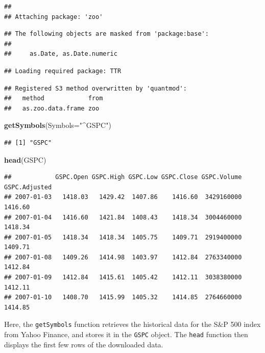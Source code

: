 \documentclass[
]{book}
\newenvironment{Shaded}{\begin{snugshade}}{\end{snugshade}}
\newcommand{\AttributeTok}[1]{\textcolor[rgb]{0.13,0.29,0.53}{#1}}
\newcommand{\FunctionTok}[1]{\textcolor[rgb]{0.13,0.29,0.53}{\textbf{#1}}}
\newcommand{\NormalTok}[1]{#1}
\newcommand{\StringTok}[1]{\textcolor[rgb]{0.31,0.60,0.02}{#1}}
\begin{document}
\begin{verbatim}
## 
## Attaching package: 'zoo'
\end{verbatim}

\begin{verbatim}
## The following objects are masked from 'package:base':
## 
##     as.Date, as.Date.numeric
\end{verbatim}

\begin{verbatim}
## Loading required package: TTR
\end{verbatim}

\begin{verbatim}
## Registered S3 method overwritten by 'quantmod':
##   method            from
##   as.zoo.data.frame zoo
\end{verbatim}

\begin{Shaded}
\begin{Highlighting}[]
\FunctionTok{getSymbols}\NormalTok{(}\AttributeTok{Symbols=}\StringTok{"\^{}GSPC"}\NormalTok{)}
\end{Highlighting}
\end{Shaded}

\begin{verbatim}
## [1] "GSPC"
\end{verbatim}

\begin{Shaded}
\begin{Highlighting}[]
\FunctionTok{head}\NormalTok{(GSPC)}
\end{Highlighting}
\end{Shaded}

\begin{verbatim}
##            GSPC.Open GSPC.High GSPC.Low GSPC.Close GSPC.Volume GSPC.Adjusted
## 2007-01-03   1418.03   1429.42  1407.86    1416.60  3429160000       1416.60
## 2007-01-04   1416.60   1421.84  1408.43    1418.34  3004460000       1418.34
## 2007-01-05   1418.34   1418.34  1405.75    1409.71  2919400000       1409.71
## 2007-01-08   1409.26   1414.98  1403.97    1412.84  2763340000       1412.84
## 2007-01-09   1412.84   1415.61  1405.42    1412.11  3038380000       1412.11
## 2007-01-10   1408.70   1415.99  1405.32    1414.85  2764660000       1414.85
\end{verbatim}

Here, the \texttt{getSymbols} function retrieves the historical data for the S\&P 500 index from Yahoo Finance, and stores it in the \texttt{GSPC} object. The \texttt{head} function then displays the first few rows of the downloaded data.
\end{document}
